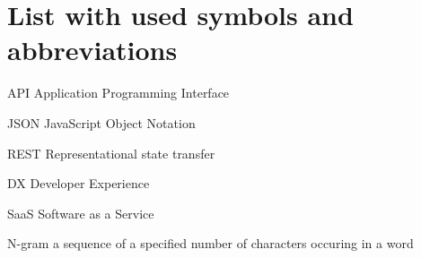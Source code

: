 
\chapter*{List with used symbols and abbreviations}

\begin{abbreviations}
\item[API] Application Programming Interface
\item[JSON] JavaScript Object Notation
\item[REST] Representational state transfer\cite{fielding2000architectural}
\item[DX] Developer Experience
\item[SaaS] Software as a Service
\item[N-gram] a sequence of a specified number of characters occuring in a word\cite{kimbrell1988searching}
\end{abbreviations}
